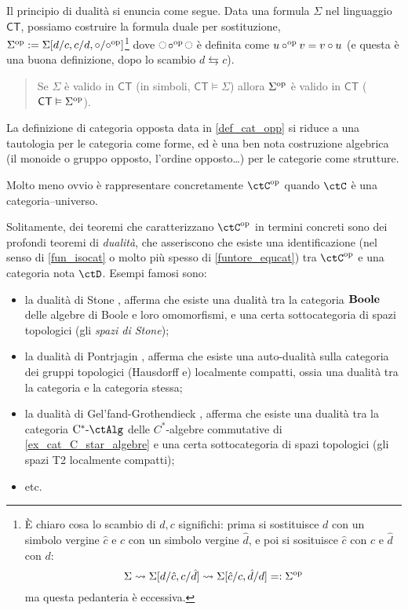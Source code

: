 \begin{proposition}
	Il principio di dualità si enuncia come segue.
	Data una formula \(\Sigma\) nel linguaggio \(\mathsf{CT}\), possiamo costruire la formula duale per sostituzione, \(\Sigma^{\text{op}}:=\Sigma[d/c,c/d,\circ/\circ^{\text{op}}]\)\footnote{\`E chiaro cosa lo scambio di \(d,c\) significhi: prima si sostituisce \(d\) con un simbolo vergine \(\hat c\) e \(c\) con un simbolo vergine \(\hat d\), e poi si sosituisce \(\hat c\) con \(c\) e \(\hat d\) con \(d\):
		\[\Sigma \rightsquigarrow \Sigma[d/\hat c,c/\hat d]\rightsquigarrow \Sigma[\hat c/c,\hat d/d] =:\Sigma^{\text{op}}\]
		ma questa pedanteria è eccessiva.} dove \(\blank\cmp^\op\blank\) è definita come \(u\circ^{\text{op}} v = v\circ u\) (e questa è una buona definizione, dopo lo scambio \(d\leftrightarrows c\)).
	\begin{quote}
		Se \(\Sigma\) è valido in \(\mathsf{CT}\) (in simboli, \(\mathsf{CT}\vDash \Sigma\)) allora \(\Sigma^{\text{op}}\) è valido in \(\mathsf{CT}\) (\(\mathsf{CT}\vDash \Sigma^{\text{op}}\)).
	\end{quote}
\end{proposition}
\begin{remark}
	La definizione di categoria opposta data in \ref{def_cat_opp} si riduce a una tautologia per le categoria come forme, ed è una ben nota costruzione algebrica (il monoide o gruppo opposto, l'ordine opposto\dots) per le categorie come strutture.

	Molto meno ovvio è rappresentare concretamente \(\ctC^\op\) quando \(\ctC\) è una categoria--universo.

	Solitamente, dei teoremi che caratterizzano \(\ctC^\op\) in termini concreti sono dei profondi teoremi di \emph{dualità}, che asseriscono che esiste una identificazione (nel senso di \ref{fun_isocat} o molto più spesso di \ref{funtore_equcat}) tra \(\ctC^\op\) e una categoria nota \(\ctD\). Esempi famosi sono:
	\begin{itemize}
		\item la dualità di Stone \cite{stone1936boolean,johnstone-stone}, afferma che esiste una dualità tra la categoria \(\mathbf{Boole}\) delle algebre di Boole e loro omomorfismi, e una certa sottocategoria di spazi topologici (gli \emph{spazi di Stone});
		\item la dualità di Pontrjagin \cite{pontrjagin1946topological}, afferma che esiste una auto-dualità sulla categoria dei gruppi topologici (Hausdorff e) localmente compatti, ossia una dualità tra la categoria e la categoria stessa;
		\item la dualità di Gel'fand-Grothendieck \cite{gelfand1941normierte,grothendieck1960ega1}, afferma che esiste una dualità tra la categoria \(\ctCsAlg\) delle \(C^*\)-algebre commutative di \autoref{ex_cat_C_star_algebre} e una certa sottocategoria di spazi topologici (gli spazi T2 localmente compatti);
		\item etc.
	\end{itemize}
\end{remark}
